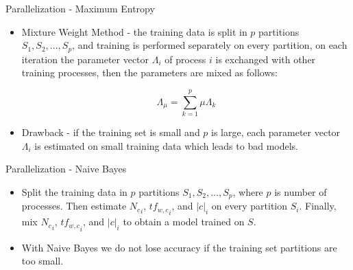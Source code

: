 \documentclass{beamer}
\begin{document}

\begin{frame}{Parallelization - Maximum Entropy}

\begin{itemize}
 \item Mixture Weight Method - the training data is split in $p$ partitions $S_1, S_2, ..., S_p$, and training is performed separately on every partition, on each iteration the parameter vector $\Lambda_i$ of process $i$ is exchanged with other training processes, then the parameters are mixed as follows:

\[
\Lambda_{\mu} = \sum_{k=1}^{p} \mu \Lambda_{k}
\]

\item Drawback - if the training set is small and $p$ is large, each parameter vector $\Lambda_i$ is estimated on small training data which leads to bad models.

\end{itemize}

\end{frame}


\begin{frame}{Parallelization - Naive Bayes}

\begin{itemize}

\item Split the training data in $p$ partitions $S_1, S_2, ..., S_p$, where $p$ is number of processes. Then estimate ${N_c}_i$, ${tf_{w,c}}_i$, and ${|c|}_i$ on every partition $S_i$. Finally, mix ${N_c}_i$, ${tf_{w,c}}_i$, and ${|c|}_i$ to obtain a model trained on $S$.

\item With Naive Bayes we do not lose accuracy if the training set partitions are too small.

\end{itemize}

\end{frame}

\end{document}
